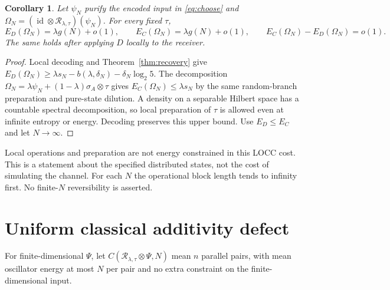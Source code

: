 \documentclass[11pt]{article}
\newtheorem{corollary}[theorem]{Corollary}
\newcommand{\Rcal}{\mathcal R_{\lambda,\tau}}
\newcommand{\id}{\operatorname{id}}
\begin{document}
\begin{corollary}\label{cor:state}
Let $\psi_N$ purify the encoded input in \eqref{eq:choose} and
$\Omega_N=(\id\otimes\Rcal)(\psi_N)$. For every fixed $\tau$,
\[
 E_D(\Omega_N)=\lambda g(N)+o(1),\qquad
 E_C(\Omega_N)=\lambda g(N)+o(1),\qquad
 E_C(\Omega_N)-E_D(\Omega_N)=o(1).
\]
The same holds after applying $D$ locally to the receiver.
\end{corollary}
\begin{proof}
Local decoding and Theorem~\ref{thm:recovery} give
$E_D(\Omega_N)\ge\lambda s_N-b(\lambda,\delta_N)-\delta_N\log_2 5$.
The decomposition
$\Omega_N=\lambda\psi_N+(1-\lambda)\sigma_A\otimes\tau$
gives $E_C(\Omega_N)\le\lambda s_N$ by the same random-branch
preparation and pure-state dilution. A density on a separable Hilbert
space has a countable spectral decomposition, so local preparation of
$\tau$ is allowed even at infinite entropy or energy. Decoding preserves
this upper bound. Use $E_D\le E_C$ and let $N\to\infty$.
\end{proof}
Local operations and preparation are not energy constrained in this
LOCC cost. This is a statement about the specified distributed states,
not the cost of simulating the channel. For each $N$ the operational
block length tends to infinity first. No finite-$N$ reversibility is asserted.

\section{Uniform classical additivity defect}
For finite-dimensional $\Psi$, let $C(\Rcal\otimes\Psi,N)$ mean $n$
parallel pairs, with mean oscillator energy at most $N$ per pair and
no extra constraint on the finite-dimensional input.
\end{document}
